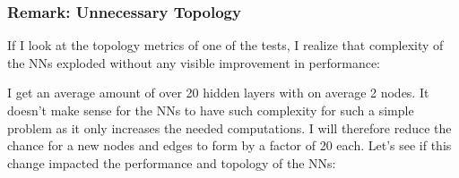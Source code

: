\documentclass[11pt]{report}
\begin{document}
\begin{enumerate}
    \subsubsection{Remark: Unnecessary Topology}
    If I look at the topology metrics of one of the tests, I realize that complexity of the NNs exploded without any visible improvement in performance:
    \begin{center}
    \end{center}
    I get an average amount of over 20 hidden layers with on average 2 nodes.
    It doesn't make sense for the NNs to have such complexity for such a simple problem as it only increases the needed computations.
    I will therefore reduce the chance for a new nodes and edges to form by a factor of 20 each.
    Let's see if this change impacted the performance and topology of the NNs:
    \\
    \begin{figure}[H]


\end{figure}
\end{enumerate}
\end{document}
